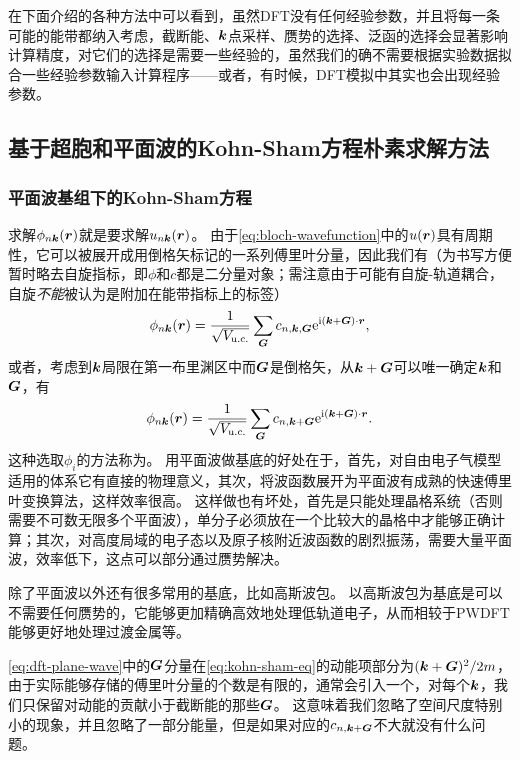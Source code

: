 在下面介绍的各种方法中可以看到，虽然DFT没有任何经验参数，并且将每一条可能的能带都纳入考虑，截断能、$\vb*{k}$点采样、赝势的选择、泛函的选择会显著影响计算精度，对它们的选择是需要一些经验的，虽然我们的确不需要根据实验数据拟合一些经验参数输入计算程序——或者，有时候，DFT模拟中其实也会出现经验参数。

\subsection{基于超胞和平面波的Kohn-Sham方程朴素求解方法}\label{sec:supercell-pwdft}

\subsubsection{平面波基组下的Kohn-Sham方程}

求解$\phi_{n \vb*{k}}(\vb*{r})$就是要求解$u_{n \vb*{k}}(\vb*{r})$。
由于\eqref{eq:bloch-wavefunction}中的$u(\vb*{r})$具有周期性，它可以被展开成用倒格矢标记的一系列傅里叶分量，因此我们有（为书写方便暂时略去自旋指标，即$\phi$和$c$都是二分量对象；需注意由于可能有自旋-轨道耦合，自旋\emph{不能}被认为是附加在能带指标上的标签）
\begin{equation}
    \phi_{n \vb*{k}}(\vb*{r}) = \frac{1}{\sqrt{V_\text{u.c.}}} \sum_{\vb*{G}} c_{n, \vb*{k}, \vb*{G}} \mathrm{e}^{\mathrm{i} (\vb*{k} + \vb*{G}) \cdot \vb*{r}},
\end{equation}
或者，考虑到$\vb*{k}$局限在第一布里渊区中而$\vb*{G}$是倒格矢，从$\vb*{k} + \vb*{G}$可以唯一确定$\vb*{k}$和$\vb*{G}$，有
\begin{equation}
    \phi_{n \vb*{k}}(\vb*{r}) = \frac{1}{\sqrt{V_\text{u.c.}}} \sum_{\vb*{G}} c_{n, \vb*{k} + \vb*{G}} \mathrm{e}^{\mathrm{i} (\vb*{k} + \vb*{G}) \cdot \vb*{r}}.
    \label{eq:dft-plane-wave}
\end{equation}
这种选取$\phi_i$的方法称为。
用平面波做基底的好处在于，首先，对自由电子气模型适用的体系它有直接的物理意义，其次，将波函数展开为平面波有成熟的快速傅里叶变换算法，这样效率很高。
这样做也有坏处，首先是只能处理晶格系统（否则需要不可数无限多个平面波），单分子必须放在一个比较大的晶格中才能够正确计算；其次，对高度局域的电子态以及原子核附近波函数的剧烈振荡，需要大量平面波，效率低下，这点可以部分通过赝势解决。

除了平面波以外还有很多常用的基底，比如高斯波包。
以高斯波包为基底是可以不需要任何赝势的，它能够更加精确高效地处理低轨道电子，从而相较于PWDFT能够更好地处理过渡金属等。

\eqref{eq:dft-plane-wave}中的$\vb*{G}$分量在\eqref{eq:kohn-sham-eq}的动能项部分为$(\vb*{k} + \vb*{G})^2 / 2m$，由于实际能够存储的傅里叶分量的个数是有限的，通常会引入一个，对每个$\vb*{k}$，我们只保留对动能的贡献小于截断能的那些$\vb*{G}$。
这意味着我们忽略了空间尺度特别小的现象，并且忽略了一部分能量，但是如果对应的$c_{n, \vb*{k} + \vb*{G}}$不大就没有什么问题。

